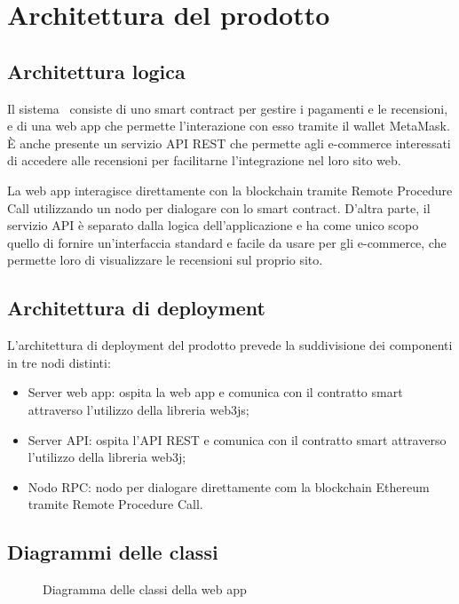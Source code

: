 \section{Architettura del prodotto}

\subsection{Architettura logica}
Il sistema \capName\ consiste di uno smart contract per gestire i pagamenti e le recensioni, e di una web app che permette l'interazione con esso tramite il wallet MetaMask. È anche presente un servizio API REST che permette agli e-commerce interessati di accedere alle recensioni per facilitarne l'integrazione nel loro sito web.

La web app interagisce direttamente con la blockchain tramite Remote Procedure Call utilizzando un nodo per dialogare con lo smart contract. D'altra parte, il servizio API è separato dalla logica dell'applicazione e ha come unico scopo quello di fornire un'interfaccia standard e facile da usare per gli e-commerce, che permette loro di visualizzare le recensioni sul proprio sito.

\subsection{Architettura di deployment}
L'architettura di deployment del prodotto prevede la suddivisione dei componenti in tre nodi distinti:
\begin{itemize}
    \item Server web app: ospita la web app e comunica con il contratto smart attraverso l'utilizzo della libreria web3js;
    \item Server API: ospita l'API REST e comunica con il contratto smart attraverso l'utilizzo della libreria web3j;
    \item Nodo RPC: nodo per dialogare direttamente com la blockchain Ethereum tramite Remote Procedure Call.
\end{itemize}

\subsection{Diagrammi delle classi}
\begin{figure}[H]
    
    \caption{Diagramma delle classi della web app}\label{fig:webapp}
\end{figure}

